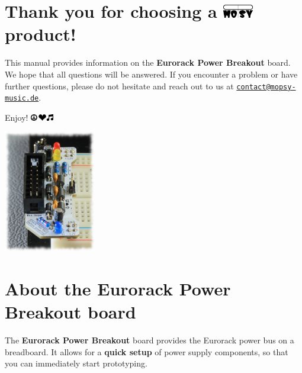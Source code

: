 \documentclass[a4paper,
               11pt,
               parskip=half,
               headinclude,
               titlepage=false]{scrartcl}
\begin{document}
\begin{minipage}[b]{10.5cm}
\setlength{\parskip}{\medskipamount}
\section*{Thank you for choosing a \includegraphics[height=0.8em]{moPsy_logo} product!}

This manual provides information on the \textbf{Eurorack Power Breakout} board.
We hope that all questions will be answered.
If you encounter a problem or have further questions,
please do not hesitate and reach out to us at \href{mailto:contact@mopsy-music.de}{\texttt{contact@mopsy-music.de}}.


\begin{center}
Enjoy! \quad \includegraphics[height=0.8em]{peace_love_music}
\end{center}

\end{minipage}%
\hspace{0.5cm}
\begin{minipage}[]{4cm}
\vspace{-3cm}
\includegraphics[width=4cm]{eurorack-power-breakout-frame}
\end{minipage}

\vspace{-3em}
\section*{About the Eurorack Power Breakout board}

The \textbf{Eurorack Power Breakout} board provides the Eurorack power bus on a breadboard.
It allows for a \textbf{quick setup} of power supply components, so that you can immediately start prototyping.
\end{document}
